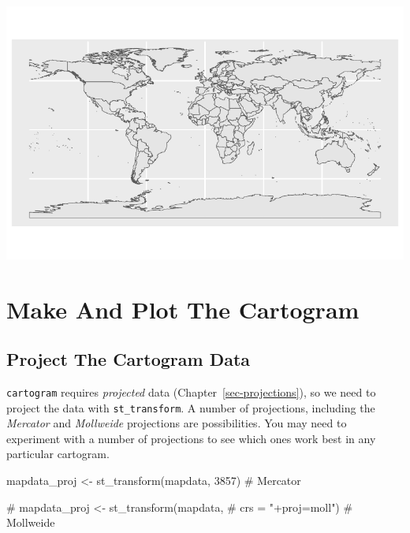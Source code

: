 \documentclass[
  letterpaper,
  DIV=11,
  numbers=noendperiod,
  oneside]{scrreprt}
\newenvironment{Shaded}{\begin{snugshade}}{\end{snugshade}}
\newcommand{\CommentTok}[1]{\textcolor[rgb]{0.37,0.37,0.37}{#1}}
\newcommand{\DecValTok}[1]{\textcolor[rgb]{0.68,0.00,0.00}{#1}}
\newcommand{\FunctionTok}[1]{\textcolor[rgb]{0.28,0.35,0.67}{#1}}
\newcommand{\NormalTok}[1]{\textcolor[rgb]{0.00,0.23,0.31}{#1}}
\newcommand{\OtherTok}[1]{\textcolor[rgb]{0.00,0.23,0.31}{#1}}
\begin{document}
\includegraphics{cartogram_files/figure-pdf/unnamed-chunk-4-1.pdf}

\section{Make And Plot The Cartogram}\label{make-and-plot-the-cartogram}

\subsection{Project The Cartogram
Data}\label{project-the-cartogram-data}

\begin{tcolorbox}[enhanced jigsaw, opacityback=0, colback=white, toprule=.15mm, colframe=quarto-callout-tip-color-frame, bottomrule=.15mm, title=\textcolor{quarto-callout-tip-color}{\faLightbulb}\hspace{0.5em}{Tip}, coltitle=black, toptitle=1mm, bottomtitle=1mm, arc=.35mm, breakable, colbacktitle=quarto-callout-tip-color!10!white, left=2mm, rightrule=.15mm, titlerule=0mm, leftrule=.75mm, opacitybacktitle=0.6]

\texttt{cartogram} requires \emph{projected} data
(Chapter~\ref{sec-projections}), so we need to project the data with
\texttt{st\_transform}. A number of projections, including the
\emph{Mercator} and \emph{Mollweide} projections are possibilities. You
may need to experiment with a number of projections to see which ones
work best in any particular cartogram.

\end{tcolorbox}

\begin{Shaded}
\begin{Highlighting}[]
\NormalTok{mapdata\_proj }\OtherTok{\textless{}{-}} \FunctionTok{st\_transform}\NormalTok{(mapdata,}
                             \DecValTok{3857}\NormalTok{) }\CommentTok{\# Mercator}

\CommentTok{\# mapdata\_proj \textless{}{-} st\_transform(mapdata, }
\CommentTok{\#                              crs = "+proj=moll") \# Mollweide}
\end{Highlighting}
\end{Shaded}
\end{document}
